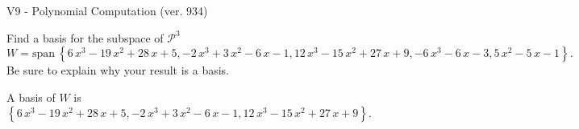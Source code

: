 \begin{exercise}
  \begin{exerciseTitle}V9 - Polynomial Computation (ver. 934)\end{exerciseTitle}
  \begin{exerciseStatement}
    Find a basis for the subspace of \(\mathcal{P}^3\) 
\[W=\mathrm{span}\ \left\{6 \, x^{3} - 19 \, x^{2} + 28 \, x + 5 , -2 \, x^{3} + 3 \, x^{2} - 6 \, x - 1 , 12 \, x^{3} - 15 \, x^{2} + 27 \, x + 9 , -6 \, x^{3} - 6 \, x - 3 , 5 \, x^{2} - 5 \, x - 1\right\}.\]
 Be sure to explain why your result is a basis.


  \end{exerciseStatement}
  \begin{exerciseAnswer}
   A basis of \(W\) is  \(\left\{6 \, x^{3} - 19 \, x^{2} + 28 \, x + 5 , -2 \, x^{3} + 3 \, x^{2} - 6 \, x - 1 , 12 \, x^{3} - 15 \, x^{2} + 27 \, x + 9\right\}\).
  


  \end{exerciseAnswer}
\end{exercise}